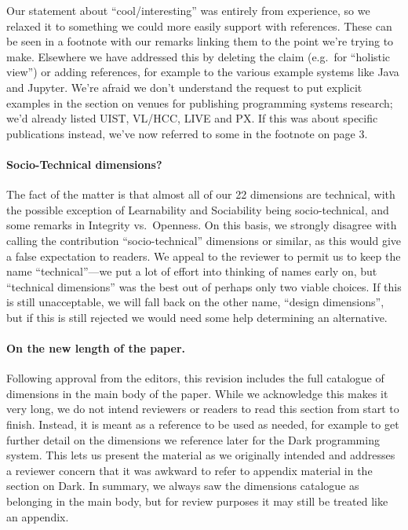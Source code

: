 Our statement about ``cool/interesting'' was entirely from experience,
so we relaxed it to something we could more easily support with
references. These can be seen in a footnote with our remarks linking
them to the point we're trying to make. Elsewhere we have addressed this
by deleting the claim (e.g.~for ``holistic view'') or adding references,
for example to the various example systems like Java and Jupyter. We're
afraid we don't understand the request to put explicit examples in the
section on venues for publishing programming systems research; we'd
already listed UIST, VL/HCC, LIVE and PX. If this was about specific
publications instead, we've now referred to some in the footnote on page
3.

\paragraph{Socio-Technical dimensions?}

The fact of the matter is that almost all of our 22 dimensions are
technical, with the possible exception of Learnability and Sociability
being socio-technical, and some remarks in Integrity vs.~Openness. On
this basis, we strongly disagree with calling the contribution
``socio-technical'' dimensions or similar, as this would give a false
expectation to readers. We appeal to the reviewer to permit us to keep
the name ``technical''---we put a lot of effort into thinking of names
early on, but ``technical dimensions'' was the best out of perhaps only
two viable choices. If this is still unacceptable, we will fall back on
the other name, ``design dimensions'', but if this is still rejected we
would need some help determining an alternative.

\paragraph{On the new length of the paper.}

Following approval from the editors, this revision includes the full
catalogue of dimensions in the main body of the paper. While we
acknowledge this makes it very long, we do not intend reviewers or
readers to read this section from start to finish. Instead, it is meant
as a reference to be used as needed, for example to get further detail
on the dimensions we reference later for the Dark programming system.
This lets us present the material as we originally intended and
addresses a reviewer concern that it was awkward to refer to appendix
material in the section on Dark. In summary, we always saw the
dimensions catalogue as belonging in the main body, but for review
purposes it may still be treated like an appendix.
